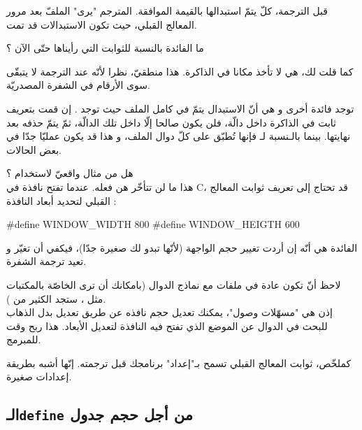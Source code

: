 \begin{Csource}
int main(int argc, char *argv[])
{
	int lives = 3;
  /* Code ... */
\end{Csource}

قبل الترجمة، كلّ
يتمّ استبدالها بالقيمة الموافقة. المترجم "يرى" الملفّ بعد مرور المعالج القبلي، حيث تكون الاستبدالات قد تمت.

\begin{question}
ما الفائدة بالنسبة للثوابت التي رأيناها حتّى الآن ؟
\end{question}

كما قلت لك، هي لا تأخذ مكانا في الذاكرة. هذا منطقيّ، نظرا لأنّه عند الترجمة لا يتبقّى سوى الأرقام في الشفرة المصدريّة.

توجد فائدة أخرى و هي أنّ الاستبدال يتمّ في كامل الملف حيث توجد
.
إن قمت بتعريف ثابت في الذاكرة داخل دالّة، فلن يكون صالحا إلّا داخل تلك الدالّة، ثمّ يتمّ حذفه بعد نهايتها.
بينما بالـنسبة لـ
فإنها تُطبّق على كلّ دوال الملف، و هذا قد يكون عمليّا جدّا في بعض الحالات.

هل من مثال واقعيّ لاستخدام
 ؟\\
هذا ما لن تتأخّر هن فعله. عندما تفتح نافذة في
\textenglish{C}، قد تحتاج إلى تعريف ثوابت المعالج القبلي لتحديد أبعاد النافذة :

\begin{Csource}
#define WINDOW_WIDTH 800
#define WINDOW_HEIGTH 600
\end{Csource}

الفائدة هي أنّه إن أردت تغيير حجم الواجهة (لأنّها تبدو لك صغيرة جدّا)، فيكفي أن تغيّر
و تعيد ترجمة الشفرة.

لاحظ أنّ
تكون عادة في ملفات
مع نماذج الدوال (بامكانك أن ترى
الخاصّة بالمكتبات مثل
،
ستجد الكثير من
).\\
إذن هي "مسهّلات وصول"، يمكنك تعديل حجم نافذه عن طريق تعديل
بدل الذهاب للبحث في الدوال عن الموضع الذي تفتح فيه النافذة لتعديل الأبعاد. هذا ربح وقت للمبرمج.

كملخّص، ثوابت المعالج القبلي تسمح بـ"إعداد" برنامجك قبل ترجمته. إنّها أشبه بطريقة إعدادات صغيرة.

\subsection{الـ\texttt{define} من أجل حجم جدول}


